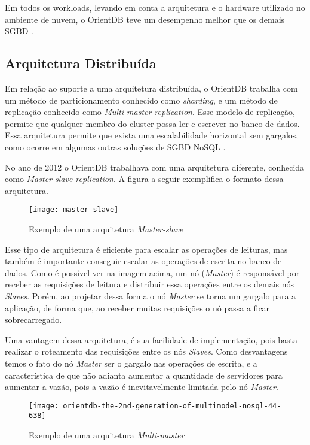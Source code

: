 	Em todos os workloads, levando em conta a arquitetura e o hardware utilizado no ambiente de nuvem, o OrientDB teve um desempenho melhor que os demais SGBD \cite{dayarathna2012xgdbench}.
	
	
\subsection{Arquitetura Distribuída} \label{orient_distributed}
	Em relação ao suporte a uma arquitetura distribuída, o OrientDB trabalha com um método de particionamento conhecido como \textit{sharding}, e um método de replicação conhecido como \textit{Multi-master replication}. Esse modelo de replicação, permite que qualquer membro do cluster possa ler e escrever no banco de dados. Essa arquitetura permite que exista uma escalabilidade horizontal sem gargalos, como ocorre em algumas outras soluções de SGBD NoSQL \cite{kauremerging}.
	
	No ano de 2012 o OrientDB trabalhava com uma arquitetura diferente, conhecida como \textit{Master-slave replication}. A figura a seguir exemplifica o formato dessa arquitetura.
	
\begin{figure}[h]
	\centering
    \texttt{[image: master-slave]}
    \caption{Exemplo de uma arquitetura \textit{Master-slave}}
    \label{fig:master-slave}
\end{figure}

	Esse tipo de arquitetura é eficiente para escalar as operações de leituras, mas também é importante conseguir escalar as operações de escrita no banco de dados. Como é possível ver na imagem acima, um nó (\textit{Master}) é responsável por receber as requisições de leitura e distribuir essa operações entre os demais nós \textit{Slaves}. Porém, ao projetar dessa forma o nó \textit{Master} se torna um gargalo para a aplicação, de forma que, ao receber muitas requisições o nó passa a ficar sobrecarregado.
	
	Uma vantagem dessa arquitetura, é sua facilidade de implementação, pois basta realizar o roteamento das requisições entre os nós \textit{Slaves}. Como desvantagens temos o fato do nó \textit{Master} ser o gargalo nas operações de escrita, e a característica de que não adianta aumentar a quantidade de servidores para aumentar a vazão, pois a vazão é inevitavelmente limitada pelo nó \textit{Master}.
	
\begin{figure}[h]
	\centering
    \texttt{[image: orientdb-the-2nd-generation-of-multimodel-nosql-44-638]}
    \caption{Exemplo de uma arquitetura \textit{Multi-master}}
    \label{fig:multi-master}
\end{figure}
	
